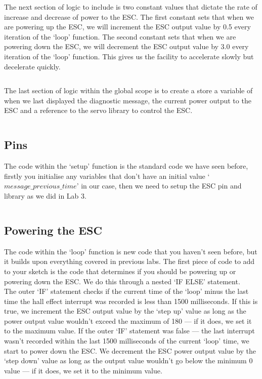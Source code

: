 \documentclass[11pt,a4paper]{article}
\begin{document}
\noindent
The next section of logic to include is two constant values that dictate the rate of increase and decrease of power to the ESC. The first constant sets that when we are powering up the ESC, we will increment the ESC output value by 0.5 every iteration of the `loop' function. The second constant sets that when we are powering down the ESC, we will decrement the ESC output value by 3.0 every iteration of the `loop' function. This gives us the facility to accelerate slowly but decelerate quickly.\\
\vspace{-1.75em}
\inputminted{arduino}{./src/2-esc-constants.txt}
\vspace{.75em}

\noindent
The last section of logic within the global scope is to create a store a variable of when we last displayed the diagnostic message, the current power output to the ESC and a reference to the servo library to control the ESC.\\
\vspace{-1.75em}
\inputminted{arduino}{./src/3-system-variables.txt}
\vspace{0em}

\subsection{Pins}
The code within the `setup' function is the standard code we have seen before, firstly you initialise any variables that don't have an initial value `$message\_previous\_time$' in our case, then we need to setup the ESC pin and library as we did in Lab 3.\\
\vspace{-1.75em}
\inputminted{arduino}{./src/4-servo.txt}
\vspace{0em}

\subsection{Powering the ESC}
The code within the `loop' function is new code that you haven't seen before, but it builds upon everything covered in previous labs. The first piece of code to add to your sketch is the code that determines if you should be powering up or powering down the ESC. We do this through a nested `IF ELSE' statement. \\

\noindent
The outer `IF' statement checks if the current time of the `loop' minus the last time the hall effect interrupt was recorded is less than 1500 milliseconds. If this is true, we increment the ESC output value by the `step up' value as long as the power output value wouldn't exceed the maximum of 180 --- if it does, we set it to the maximum value. If the outer `IF' statement was false --- the last interrupt wasn't recorded within the last 1500 milliseconds of the current `loop' time, we start to power down the ESC. We decrement the ESC power output value by the `step down' value as long as the output value wouldn't go below the minimum 0 value --- if it does, we set it to the minimum value.\\
\end{document}
